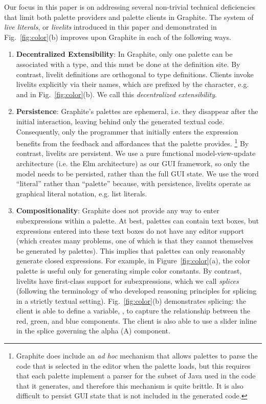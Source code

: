 Our focus in this paper is on addressing several non-trivial technical 
deficiencies that limit both palette providers and palette clients in Graphite. 
The system of \emph{live literals}, or \emph{livelits} introduced in
this paper and demonstrated in Fig.~\ref{fig:color}(b) improves upon Graphite  
in each of the following ways.
\begin{enumerate}
  \setlength\itemsep{0.5em}
  \item \textbf{Decentralized Extensibility}: 
    In Graphite, only one palette can be associated with a type, and this must
    be done at the definition site.
    By contrast, livelit definitions are orthogonal to type definitions. 
    Clients invoke livelits explicitly via their names, which are prefixed by the \li{\$} character, 
    e.g.  and  in Fig.~\ref{fig:color}(b).
    We call this \emph{decentralized extensibility}.
  \item \textbf{Persistence}: Graphite's palettes are {ephemeral}, 
  i.e. they disappear after the initial interaction, 
  leaving behind only the generated textual code.
  Consequently, only the programmer that initially enters the expression 
  benefits from the feedback and affordances that the palette provides.%
  \footnote{Graphite does include an \emph{ad hoc} mechanism that 
  allows palettes to parse the code that is selected in the editor 
  when the palette loads, but this requires that each palette implement 
  a parser for the subset of Java used in the code that it generates,
  and therefore this mechanism is quite brittle. It is also difficult 
  to persist GUI state that is not included in the generated code.}
  By contrast, livelits are persistent. We use a pure functional model-view-update architecture 
  (i.e. the Elm architecture) as our GUI framework, 
  so only the model needs to be persisted, rather than the full GUI state.  
  We use the word ``literal'' rather than ``palette'' because, with persistence, livelits
  operate as graphical literal notation, e.g. list literals.

  \item \textbf{Compositionality}: 
  Graphite does not provide any way to {enter subexpressions within a palette}.
  At best, palettes can contain text boxes, but expressions entered into these text boxes 
  do not have any editor support (which creates many problems, one of which is that they cannot themselves be generated by palettes). 
  This implies that palettes can only reasonably generate {closed expressions}. 
  For example, in Figure~\ref{fig:color}(a), the color palette
  is useful only for generating simple color constants. 
  By contrast, livelits have first-class support for subexpressions, which we call \emph{splices} (following
  the terminology of \citet{TLMs} who developed reasoning principles for splicing in a strictly textual setting).
  Fig.~\ref{fig:color}(b) demonstrates splicing: the client is able to define a variable, , 
  to capture the relationship between the red, green, and blue components.
  The client is also able to use a slider inline in the splice governing 
  the alpha (A) component.


\end{enumerate}
